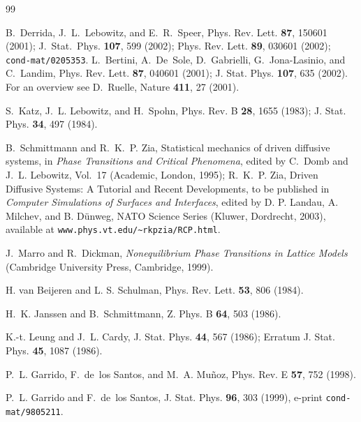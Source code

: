 \documentclass[12pt]{article}
\begin{document}
 
\begin{thebibliography}{99}

B.~Derrida, J.~L.~Lebowitz, and E.~R.~Speer,
Phys. Rev. Lett. {\bf 87}, 150601 (2001);
J.~Stat.~Phys. {\bf 107}, 599 (2002);
Phys. Rev. Lett. {\bf 89}, 030601 (2002);
{\tt cond-mat/0205353}.
L.~Bertini, A.~De~Sole, D.~Gabrielli, G.~Jona-Lasinio, and C.~Landim,
Phys. Rev. Lett. {\bf 87}, 040601 (2001);
J. Stat. Phys. {\bf 107}, 635 (2002).
For an overview see D.~Ruelle, Nature {\bf 411}, 27 (2001).

S.~Katz, J.~L. Lebowitz, and H.~Spohn,
Phys. Rev. B {\bf 28}, 1655 (1983);
J. Stat. Phys. {\bf 34}, 497 (1984).

B.~Schmittmann and R.~K.~P. Zia,
Statistical mechanics of driven diffusive systems,
in {\em Phase Transitions and Critical Phenomena}, edited by C.~Domb
and J.~L. Lebowitz, Vol.~17 (Academic, London, 1995); 
R.~K.~P. Zia, Driven Diffusive Systems: A Tutorial and Recent Developments, 
to be published in {\em Computer Simulations of Surfaces and Interfaces},
edited by D. P. Landau, A. Milchev, and B. D\"unweg,
NATO Science Series (Kluwer, Dordrecht, 2003), available at
{\tt www.phys.vt.edu/\~{}rkpzia/RCP.html}.

J.~Marro and R.~Dickman,
{\em Nonequilibrium Phase Transitions in Lattice Models} (Cambridge
  University Press, Cambridge, 1999).

H. van Beijeren and L. S. Schulman,
Phys. Rev. Lett. {\bf 53}, 806 (1984).

H.~K. Janssen and B.~Schmittmann,
\newblock Z. Phys. B {\bf 64}, 503 (1986).

K.-t. Leung and J.~L. Cardy,
\newblock J. Stat. Phys. {\bf 44}, 567 (1986);
Erratum J. Stat. Phys. {\bf 45}, 1087 (1986).

P.~L. Garrido, F.~de~los Santos, and M.~A. Mu{\~n}oz,
Phys. Rev. E {\bf 57}, 752 (1998).

P.~L. Garrido and F.~de~los Santos,
J. Stat. Phys. {\bf 96}, 303 (1999), 
e-print {\tt cond-mat/9805211}.


\end{thebibliography}
\end{document}
